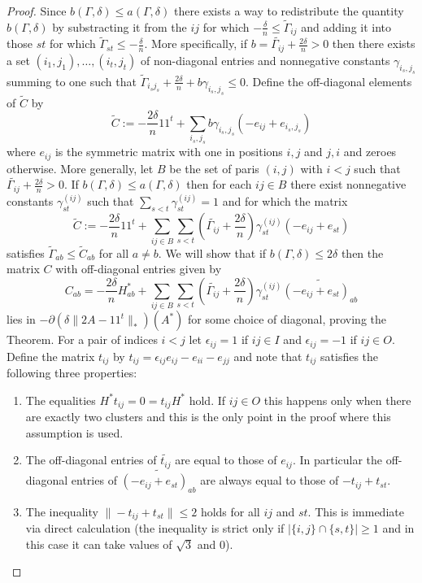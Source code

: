 \documentclass[12pt]{amsart}
\numberwithin{equation}{section}
\begin{document}
\begin{proof}
Since $b(\Gamma,\delta)\leq a(\Gamma,\delta)$ there exists a way to redistribute the quantity $b(\Gamma,\delta)$ by substracting it from the $ij$ for which $-\frac{\delta}{n}\leq \widetilde{\Gamma}_{ij}$  and adding it into those $st$ for which $\widetilde{\Gamma}_{st}\leq -\frac{\delta}{n}$. More specifically, if $b=\widetilde{\Gamma_{ij}}+\frac{2\delta}{n}>0$ then there exists a set $(i_1,j_1),\dots, (i_t,j_t)$ of non-diagonal entries and nonnegative constants $\gamma_{i_s,j_s}$ summing to one 
such that $\widetilde{\Gamma}_{i_sj_s}+\frac{2\delta}{n}+ b\gamma_{i_s,j_s}\leq 0$. Define the off-diagonal elements of $\widetilde{C}$ by
\[\widetilde{C}:=-\frac{2\delta}{n} 11^t + \sum_{i_s,j_s} b\gamma_{i_s,j_s}(-e_{ij}+e_{i_s,j_s})\]
where $e_{ij}$ is the symmetric matrix with one in positions $i,j$ and $j,i$ and zeroes otherwise. More generally, let $B$ be the set of paris $(i,j)$ with $i<j$ such that $\widetilde{\Gamma_{ij}}+\frac{2\delta}{n}>0$. If $b(\Gamma,\delta)\leq a(\Gamma,\delta)$ then for each $ij\in B$ there exist nonnegative constants $\gamma^{(ij)}_{st}$ such that $\sum_{s < t} \gamma^{(ij)}_{st}=1$ and for which the matrix
\[\widetilde{C}:=-\frac{2\delta}{n}11^t+\sum_{ij\in B} \sum_{s<t} \left(\widetilde{\Gamma_{ij}}+\frac{2\delta}{n}\right)\gamma_{st}^{(ij)} (-e_{ij}+e_{st})\]  
satisfies $\widetilde{\Gamma}_{ab}\leq \widetilde{C}_{ab}$ for all $a\neq b$. We will show that if $b(\Gamma,\delta)\leq 2\delta$ then the matrix $C$ with off-diagonal entries given by
\[C_{ab}=-\frac{2\delta}{n}H^*_{ab} + \sum_{ij\in B} \sum_{s<t} \left(\widetilde{\Gamma_{ij}}+\frac{2\delta}{n}\right)\gamma_{st}^{(ij)} \widetilde{(-e_{ij}+e_{st})_{ab}}\]
lies in $-\partial \left(\delta\|2A-11^t\|_*\right)(A^*)$ for some choice of diagonal, proving the Theorem. 
For a pair of indices $i<j$ let $\epsilon_{ij}=1$ if $ij\in I$ and $\epsilon_{ij}=-1$ if $ij\in O$. Define the matrix $t_{ij}$ by $t_{ij}=\epsilon_{ij} e_{ij}-e_{ii}-e_{jj}$ and note that $t_{ij}$ satisfies the following three properties: 
\begin{enumerate}
\item The equalities $H^*t_{ij}=0=t_{ij}H^*$ hold. If $ij\in O$ this happens only when there are exactly two clusters and this is the only point in the proof where this assumption is used.
\item The off-diagonal entries of $\widetilde{t_{ij}}$ are equal to those of $e_{ij}$. In particular the off-diagonal entries of $\widetilde{(-e_{ij}+e_{st})_{ab}}$ are always equal to those of $-t_{ij}+t_{st}$.
\item The inequality $\|-t_{ij}+t_{st}\|\leq 2$ holds for all $ij$ and $st$. This is immediate via direct calculation (the inequality is strict only if $|\{i,j\}\cap\{s,t\}|\geq 1$ and in this case it can take values of $\sqrt{3}$ and $0$).  

\end{enumerate}
\end{proof}
\end{document}
